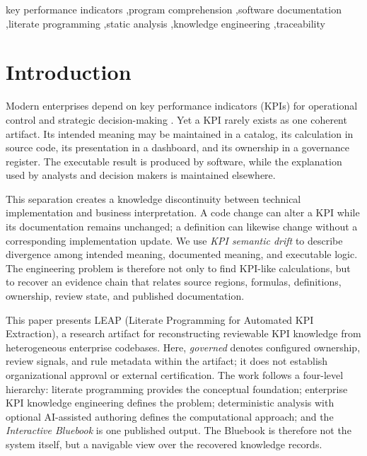 \documentclass[a4paper,fleqn]{cas-dc}
\newcommand{\tool}{\textsc{LEAP}}
\newcommand{\bluebook}{\emph{Interactive Bluebook}}
\begin{document}
\begin{keywords}
key performance indicators \sep program comprehension \sep software documentation \sep literate programming \sep static analysis \sep knowledge engineering \sep traceability
\end{keywords}

\maketitle

\section{Introduction}

Modern enterprises depend on key performance indicators (KPIs) for operational control and strategic decision-making \citep{Parmenter2015,Kaplan1996}. Yet a KPI rarely exists as one coherent artifact. Its intended meaning may be maintained in a catalog, its calculation in source code, its presentation in a dashboard, and its ownership in a governance register. The executable result is produced by software, while the explanation used by analysts and decision makers is maintained elsewhere.

This separation creates a knowledge discontinuity between technical implementation and business interpretation. A code change can alter a KPI while its documentation remains unchanged; a definition can likewise change without a corresponding implementation update. We use \emph{KPI semantic drift} to describe divergence among intended meaning, documented meaning, and executable logic. The engineering problem is therefore not only to find KPI-like calculations, but to recover an evidence chain that relates source regions, formulas, definitions, ownership, review state, and published documentation.

This paper presents \tool{} (Literate Programming for Automated KPI Extraction), a research artifact for reconstructing reviewable KPI knowledge from heterogeneous enterprise codebases. Here, \emph{governed} denotes configured ownership, review signals, and rule metadata within the artifact; it does not establish organizational approval or external certification. The work follows a four-level hierarchy: literate programming provides the conceptual foundation; enterprise KPI knowledge engineering defines the problem; deterministic analysis with optional AI-assisted authoring defines the computational approach; and the \bluebook{} is one published output. The Bluebook is therefore not the system itself, but a navigable view over the recovered knowledge records.
\end{document}
